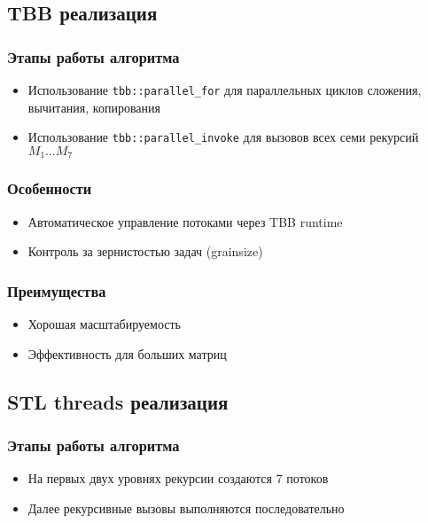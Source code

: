 \documentclass[12pt]{article}
\begin{document}
\subsection{TBB реализация}
\subsubsection*{Этапы работы алгоритма}
\begin{itemize}
  \item Использование \texttt{tbb::parallel\_for} для параллельных циклов сложения, вычитания, копирования
  \item Использование \texttt{tbb::parallel\_invoke} для вызовов всех семи рекурсий $M_1 \dots M_7$
\end{itemize}

\subsubsection*{Особенности}
\begin{itemize}
  \item Автоматическое управление потоками через TBB runtime
  \item Контроль за зернистостью задач (grainsize)
\end{itemize}

\subsubsection*{Преимущества}
\begin{itemize}
  \item Хорошая масштабируемость
  \item Эффективность для больших матриц
\end{itemize}

\subsection{STL threads реализация}
\subsubsection*{Этапы работы алгоритма}
\begin{itemize}
  \item На первых двух уровнях рекурсии создаются 7 потоков
  \item Далее рекурсивные вызовы выполняются последовательно
\end{itemize}
\end{document}
